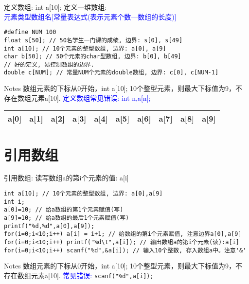\begin{frame}{定义数组: int a[10];}
\vspace{-0.3cm}
定义一维数组: \\
\textcolor{blue}{元素类型\quad 数组名[常量表达式(表示元素个数---数组的长度)]}
\vspace{-0.2cm}
\begin{lstlisting}
#define NUM 100
float s[50]; // 50名学生一门课的成绩, 边界: s[0], s[49]
int a[10]; // 10个元素的整型数组, 边界: a[0], a[9]
char b[50]; // 50个元素的char型数组, 边界: b[0], b[49]
// 好的定义, 易控制数组的边界.
double c[NUM]; // 常量NUM个元素的double数组, 边界: c[0], c[NUM-1]

\end{lstlisting}
\vspace{-0.3cm}
\begin{block}{Notes}
	数组元素的下标从0开始，int a[10]; 10个整型元素，则最大下标值为9，不存在数组元素a[10]. \textcolor{blue}{定义数组常见错误: int n,a[n];}
\end{block}
\begin{tabular}{|c|c|c|c|c|c|c|c|c|c|}
	\hline 
	a[0] & a[1] & a[2] & a[3] & a[4] & a[5] & a[6] & a[7] & a[8] & a[9] \\ 
	\hline 
\end{tabular} 
\end{frame}

\section{引用数组}

\begin{frame}{引用数组: 读写数组a的第i个元素的值: a[i]}
\begin{lstlisting}
int a[10]; // 10个元素的整型数组, 边界: a[0],a[9]
int i;
a[0]=10; // 给a数组的第1个元素赋值(写)
a[9]=10; // 给a数组的最后1个元素赋值(写)
printf("%d,%d",a[0],a[9]);
for(i=0;i<10;i++) a[i] = i+1; // 给数组的第i个元素赋值, 注意边界a[0],a[9]
for(i=0;i<10;i++) printf("%d\t",a[i]); // 输出数组a的第i个元素(读):a[i]
for(i=0;i<10;i++) scanf("%d",&a[i]); // 输入10个整数, 存入数组a中。注意'&'
\end{lstlisting}
\begin{block}{Notes}
	数组元素的下标从0开始，int a[10]; 10个整型元素，则最大下标值为9，不存在数组元素a[10]. \textcolor{blue}{常见错误: } \lstinline|scanf("%d",a[i]);|
\end{block}
\end{frame}

